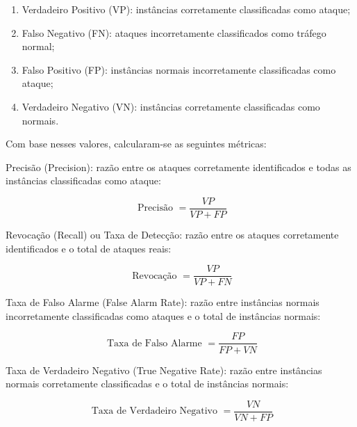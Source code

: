 \documentclass[conference]{IEEEtran}
\begin{document}
    \hspace{1cm}
    \begin{enumerate}[I]
    \item Verdadeiro Positivo (VP): instâncias corretamente classificadas como ataque;
    \item Falso Negativo (FN): ataques incorretamente classificados como tráfego normal;
    \item Falso Positivo (FP): instâncias normais incorretamente classificadas como ataque;
    \item Verdadeiro Negativo (VN): instâncias corretamente classificadas como normais.
    \end{enumerate}
    \hspace{1cm}

    Com base nesses valores, calcularam-se as seguintes métricas:
    
    \hspace{1cm}
    
    Precisão (Precision): razão entre os ataques corretamente identificados e todas as instâncias classificadas como ataque:

    \begin{equation}
    \text { Precisão }=\frac{V P}{V P+F P}
    \end{equation}
    \hspace{1cm}
    
    Revocação (Recall) ou Taxa de Detecção: razão entre os ataques corretamente identificados e o total de ataques reais:

    \begin{equation}
    \text { Revocação }=\frac{V P}{V P+F N}
    \end{equation}
    \hspace{1cm}
    
    Taxa de Falso Alarme (False Alarm Rate): razão entre instâncias normais incorretamente classificadas como ataques e o total de instâncias normais:

    \begin{equation}
    \text { Taxa de Falso Alarme }=\frac{F P}{F P+V N}
    \end{equation}
    \hspace{1cm}
    
    Taxa de Verdadeiro Negativo (True Negative Rate): razão entre instâncias normais corretamente classificadas e o total de instâncias normais:

    \begin{equation}
    \text { Taxa de Verdadeiro Negativo }=\frac{V N}{V N+F P}
    \end{equation}
    \hspace{1cm}
    
\end{document}

